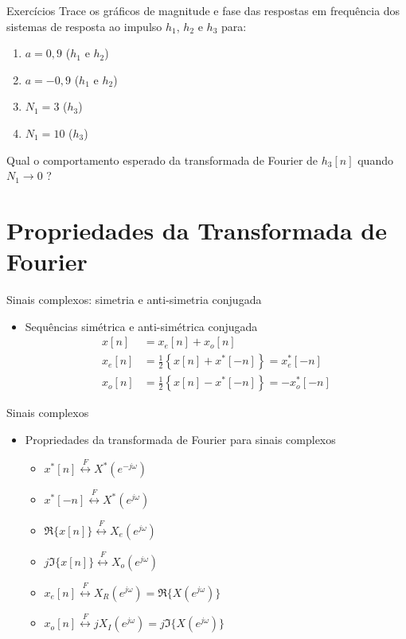 \begin{note}[toc=]{Exercícios}
Trace os gráficos de magnitude e fase das respostas em frequência dos sistemas de resposta ao impulso $h_1$, $h_2$ e $h_3$ para: 
\begin{enumerate}
   \item $a = 0,9$ ($h_1$ e $h_2$)
   \item $a = -0,9$ ($h_1$ e $h_2$)
   \item $N_1 = 3$ ($h_3$)
   \item $N_1 = 10$  ($h_3$)
\end{enumerate}
Qual o comportamento esperado da transformada de Fourier de $h_3[n]$ quando $N_1\rightarrow 0$ ?
\end{note}

\section[slide=true]{Propriedades da Transformada de Fourier}
\begin{slide}[toc=]{Sinais complexos: simetria e anti-simetria conjugada}
\begin{itemize}
   \item Sequências  simétrica e anti-simétrica conjugada
   \begin{align*}
      x[n] &= x_e[n]+x_o[n]\\
      x_e[n] &= \frac{1}{2} \left \{ x[n] + x^*[-n] \right \} = x_e^*[-n]\\
      x_o[n] &= \frac{1}{2} \left \{ x[n] - x^*[-n] \right \} = -x_o^*[-n]
   \end{align*} 
\end{itemize}
\end{slide}

\begin{slide}[toc=]{Sinais complexos}
\begin{itemize}
   \item Propriedades da transformada de Fourier para sinais complexos
\begin{itemize}
   \item $x^*[n]\stackrel{F}{\leftrightarrow} X^*(e^{-j\omega})$
   \item $x^*[-n]\stackrel{F}{\leftrightarrow} X^*(e^{j\omega})$
   \item $\Re\{x[n]\} \stackrel{F}{\leftrightarrow} X_e(e^{j\omega})$
   \item $j\Im\{x[n]\} \stackrel{F}{\leftrightarrow} X_o(e^{j\omega})$
   \item $x_e[n] \stackrel{F}{\leftrightarrow} X_R(e^{j\omega}) = \Re\{X(e^{j\omega})\}$
   \item $x_o[n] \stackrel{F}{\leftrightarrow} jX_I(e^{j\omega}) = j\Im\{X(e^{j\omega})\}$
\end{itemize}
\end{itemize}
\end{slide}


